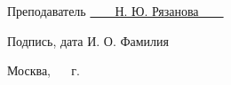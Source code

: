 \begin{titlepage}
\vspace{0.5cm}

\fontsize{12pt}{12pt}\selectfont
\noindent\textnormal{Преподаватель} \hspace{52mm}
\underline{\textnormal{\hphantom{~~~~~~~~~~~~~~~~~~~~~~~~~~~}}} \hspace{14mm}
\noindent\underline{\textnormal{~~~~Н. Ю. Рязанова~~~~}}

\vspace{2mm}
\noindent\textnormal{\hphantom{Студент}} \hspace{17mm}\noindent
\fontsize{8pt}{8pt}
\hphantom{Группа}\hspace{43mm}\textnormal{Подпись, дата} \hspace{30mm}\noindent\textnormal{И. О. Фамилия}

\vspace{0.5cm}

\fontsize{12pt}{12pt}\selectfont

\begin{center}
	\vfill
	Москва, ~\the\year
	~г.
\end{center}

\restoregeometry
\end{titlepage}

